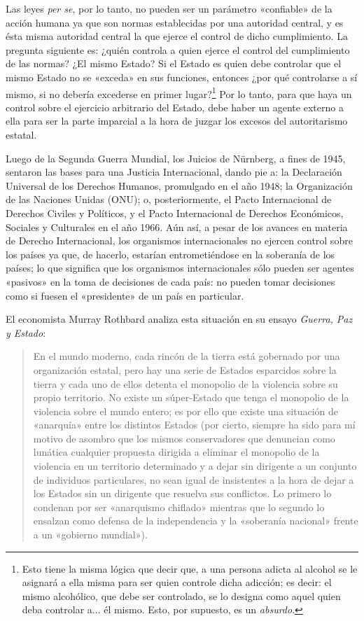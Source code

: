 \documentclass[12pt,a4paper,twoside]{book}
\begin{document}
Las leyes \textit{per se}, por lo tanto, no pueden ser un parámetro «confiable» de la acción humana ya que son normas establecidas por una autoridad central, y es ésta misma autoridad central la que ejerce el control de dicho cumplimiento. La pregunta siguiente es: ¿quién controla a quien ejerce el control del cumplimiento de las normas? ¿El mismo Estado? Si el Estado es quien debe controlar que el mismo Estado no se «exceda» en sus funciones, entonces ¿por qué controlarse a sí mismo, si no debería excederse en primer lugar?\footnote{Esto tiene la misma lógica que decir que, a una persona adicta al alcohol se le asignará a ella misma para ser quien controle dicha adicción; es decir: el mismo alcohólico, que debe ser controlado, se lo designa como aquel quien deba controlar a... él mismo. Esto, por supuesto, es un \textit{absurdo}.} Por lo tanto, para que haya un control sobre el ejercicio arbitrario del Estado, debe haber un agente externo a ella para ser la parte imparcial a la hora de juzgar los excesos del autoritarismo estatal.

Luego de la Segunda Guerra Mundial, los Juicios de Nürnberg, a fines de 1945, sentaron las bases para una Justicia Internacional, dando pie a: la Declaración Universal de los Derechos Humanos, promulgado en el año 1948; la Organización de las Naciones Unidas (ONU); o, posteriormente, el Pacto Internacional de Derechos Civiles y Políticos, y el Pacto Internacional de Derechos Económicos, Sociales y Culturales en el año 1966. Aún así, a pesar de los avances en materia de Derecho Internacional, los organismos internacionales no ejercen control sobre los países ya que, de hacerlo, estarían entrometiéndose en la soberanía de los países; lo que significa que los organismos internacionales sólo pueden ser agentes «pasivos» en la toma de decisiones de cada país: no pueden tomar decisiones como si fuesen el «presidente» de un país en particular.

El economista Murray Rothbard analiza esta situación en su ensayo \textit{Guerra, Paz y Estado}:

\begin{quotation}
En el mundo moderno, cada rincón de la tierra está gobernado por una organización estatal, pero hay una serie de Estados esparcidos sobre la tierra y cada uno de ellos detenta el monopolio de la violencia sobre su propio territorio. No existe un súper-Estado que tenga el monopolio de la violencia sobre el mundo entero; es por ello que existe una situación de «anarquía» entre los distintos Estados (por cierto, siempre ha sido para mí motivo de asombro que los mismos conservadores que denuncian como lunática cualquier propuesta dirigida a eliminar el monopolio de la violencia en un territorio determinado y a dejar sin dirigente a un conjunto de individuos particulares, no sean igual de insistentes a la hora de dejar a los Estados sin un dirigente que resuelva sus conflictos. Lo primero lo condenan por ser «anarquismo chiflado» mientras que lo segundo lo ensalzan como defensa de la independencia y la «soberanía nacional» frente a un «gobierno mundial»). \cite[pág. 105]{rothbard:igualitarismo}
\end{quotation}
\end{document}
